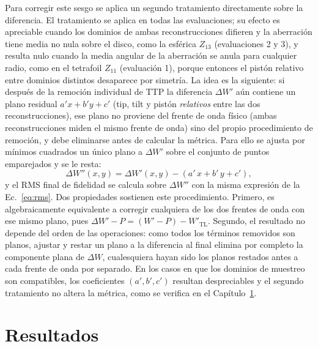 \documentclass[letterpaper,12pt,oneside]{book}
\begin{document}
Para corregir este sesgo se aplica un segundo tratamiento directamente sobre la diferencia. El tratamiento se aplica en todas las evaluaciones; su efecto es apreciable cuando los dominios de ambas reconstrucciones difieren y la aberración tiene media no nula sobre el disco, como la esférica $Z_{13}$ (evaluaciones 2 y 3), y resulta nulo cuando la media angular de la aberración se anula para cualquier radio, como en el tetrafoil $Z_{11}$ (evaluación 1), porque entonces el pistón relativo entre dominios distintos desaparece por simetría. La idea es la siguiente: si después de la remoción individual de TTP la diferencia $\Delta W'$ aún contiene un plano residual $a'x + b'y + c'$ (tip, tilt y pistón \emph{relativos} entre las dos reconstrucciones), ese plano no proviene del frente de onda físico (ambas reconstrucciones miden el mismo frente de onda) sino del propio procedimiento de remoción, y debe eliminarse antes de calcular la métrica. Para ello se ajusta por mínimos cuadrados un único plano a $\Delta W'$ sobre el conjunto de puntos emparejados y se le resta:
\begin{equation}
\Delta W''(x,y) = \Delta W'(x,y) - (a'\,x + b'\,y + c'),
\label{eq:residuo-doble}
\end{equation}
y el RMS final de fidelidad se calcula sobre $\Delta W''$ con la misma expresión de la Ec.~\ref{eq:rms}. Dos propiedades sostienen este procedimiento. Primero, es algebraicamente equivalente a corregir cualquiera de los dos frentes de onda con ese mismo plano, pues $\Delta W' - P = (W' - P) - W'_\text{TL}$. Segundo, el resultado no depende del orden de las operaciones: como todos los términos removidos son planos, ajustar y restar un plano a la diferencia al final elimina por completo la componente plana de $\Delta W$, cualesquiera hayan sido los planos restados antes a cada frente de onda por separado. En los casos en que los dominios de muestreo son compatibles, los coeficientes $(a', b', c')$ resultan despreciables y el segundo tratamiento no altera la métrica, como se verifica en el Capítulo~\ref{cap:resultados}.

\chapter{Resultados}\label{cap:resultados}
\end{document}
